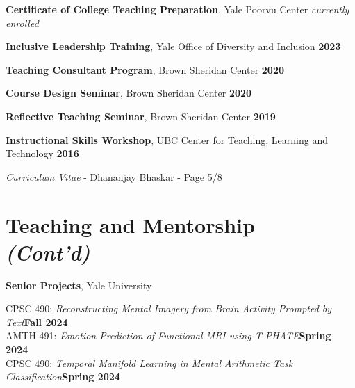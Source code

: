\documentclass[margin,line]{res}
\newenvironment{list1}{
  \begin{list}{\ding{113}}{
      \setlength{\itemsep}{0in}
      \setlength{\parsep}{0in} \setlength{\parskip}{0in}
      \setlength{\topsep}{0in} \setlength{\partopsep}{0in}
      \setlength{\leftmargin}{0.17in}}}{\end{list}}
\newenvironment{list2}{
  \begin{list}{$\bullet$}{
      \setlength{\itemsep}{0in}
      \setlength{\parsep}{0in} \setlength{\parskip}{0in}
      \setlength{\topsep}{0in} \setlength{\partopsep}{0in}
      \setlength{\leftmargin}{0.2in}}}{\end{list}}
\begin{document}
\begin{resume}
\begin{list1}
\setlength\itemsep{0.25em}
\item[] {\bf Certificate of College Teaching Preparation}, Yale Poorvu Center \hfill \textit{currently enrolled}
\item[] {\bf Inclusive Leadership Training}, Yale Office of Diversity and Inclusion \hfill {\bf \small 2023}
\item[] {\bf Teaching Consultant Program}, Brown Sheridan Center \hfill {\bf \small 2020}
\item[] {\bf Course Design Seminar}, Brown Sheridan Center \hfill {\bf \small 2020}
\item[] {\bf Reflective Teaching Seminar}, Brown Sheridan Center \hfill {\bf \small 2019}
\item[] {\bf Instructional Skills Workshop}, UBC Center for Teaching, Learning and Technology \hfill {\bf \small 2016}
\end{list1} 

\newpage
\begin{flushright}
\textit{Curriculum Vitae} - Dhananjay Bhaskar - Page 5/8
\end{flushright}
\vspace*{.1cm}

\section{\sc Teaching and Mentorship\\\textit{(Cont'd)}}

\textbf{Senior Projects}, Yale University

\vspace{-.3cm}
CPSC 490: \textit{Reconstructing Mental Imagery from Brain Activity Prompted by Text}\hfill {\bf \small Fall 2024}\\
AMTH 491: \textit{Emotion Prediction of Functional MRI using T-PHATE}\hfill {\bf \small Spring 2024}\\
CPSC 490: \textit{Temporal Manifold Learning in Mental Arithmetic Task Classification}\hfill {\bf \small Spring 2024}\\


\end{resume}
\end{document}
